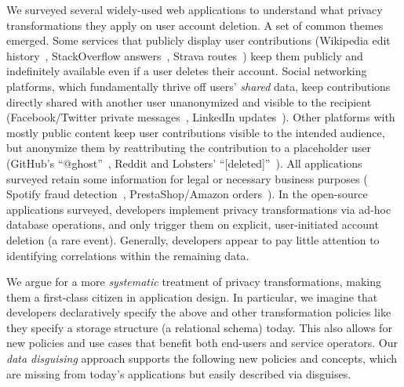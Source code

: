 %
We surveyed several widely-used web applications to understand what privacy transformations
they apply on user account deletion.
%
A set of common themes emerged.
%
Some services that publicly display user contributions (\eg Wikipedia edit
history~\cite{wikipedia:privacy}, StackOverflow answers~\cite{stackoverflow:privacy},
Strava routes~\cite{strava:privacy}) keep them publicly and indefinitely available even if a user deletes
their account.
%
Social networking platforms, which fundamentally thrive off users' \emph{shared} data, keep
contributions directly shared with another user unanonymized and visible to the recipient
(\eg Facebook/Twitter private messages~\cite{facebook:privacy, twitter:privacy},
LinkedIn updates~\cite{linkedin:privacy}).
%
Other platforms with mostly public content keep user contributions visible to the intended
audience, but anonymize them by reattributing the contribution to a placeholder user
(\eg GitHub's ``@ghost''~\cite{github:privacy}, Reddit and Lobsters'
``[deleted]''~\cite{reddit:privacy, lobsters:privacy}).
%
%
All applications surveyed retain some information for legal or necessary business purposes (\eg
Spotify fraud detection~\cite{spotify:privacy}, PrestaShop/Amazon orders~\cite{amazon:privacy,
prestashop:privacy}).
%
In the open-source applications surveyed, developers implement privacy transformations
via ad-hoc database operations, and only trigger them on explicit, user-initiated account
deletion (a rare event).
%
Generally, developers appear to pay little attention to identifying correlations
within the remaining data.
%

%
We argue for a more \emph{systematic} treatment of privacy transformations, making them a
first-class citizen in application design.
%
In particular, we imagine that developers declaratively specify the above and other
transformation policies like they specify a storage structure (\eg a relational schema) today.
%
This also allows for new policies and use cases that benefit both end-users and service operators.
%
Our \emph{data disguising} approach supports the following new policies and concepts,
which are missing from today's applications but easily described via disguises.
%

